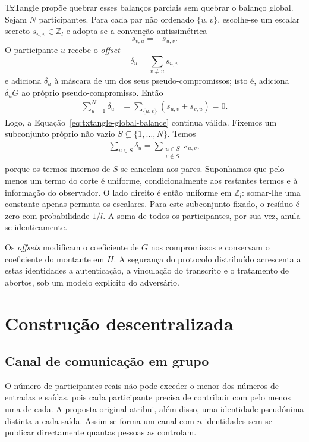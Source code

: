 TxTangle propõe quebrar esses balanços parciais sem quebrar o balanço global.
Sejam \(N\) participantes. Para cada par não ordenado \(\{u,v\}\), escolhe-se
um escalar secreto \(s_{u,v}\in\mathbb Z_l\) e adopta-se a convenção
antissimétrica
\[
 s_{v,u}=-s_{u,v}.
\]
O participante \(u\) recebe o \emph{offset}
\[
 \delta_u=\sum_{v\ne u}s_{u,v}
\]
e adiciona \(\delta_u\) à máscara de um dos seus pseudo-compromissos; isto é,
adiciona \(\delta_uG\) ao próprio pseudo-compromisso. Então
\begin{align}
 \sum_{u=1}^{N}\delta_u
 &=\sum_{\{u,v\}}(s_{u,v}+s_{v,u})=0.           \label{eq:txtangle-offset-zero}
\end{align}
Logo, a Equação~\eqref{eq:txtangle-global-balance} continua válida. Fixemos um
subconjunto próprio não vazio \(S\subsetneq\{1,\ldots,N\}\). Temos
\begin{align}
 \sum_{u\in S}\delta_u
   =\sum_{\substack{u\in S\\v\notin S}}s_{u,v}, \label{eq:txtangle-cut}
\end{align}
porque os termos internos de \(S\) se cancelam aos pares. Suponhamos que
pelo menos um termo do corte é uniforme, condicionalmente aos restantes
termos e à informação do observador. O lado direito é então uniforme em
\(\mathbb Z_l\): somar-lhe uma constante apenas permuta os escalares.
Para este subconjunto fixado, o resíduo é zero com probabilidade \(1/l\).
A soma de todos os participantes, por sua vez, anula-se identicamente.

Os \emph{offsets} modificam o coeficiente de \(G\) nos compromissos e
conservam o coeficiente do montante em \(H\). A segurança do protocolo
distribuído acrescenta a estas identidades a autenticação, a vinculação
do transcrito e o tratamento de abortos, sob um modelo explícito do adversário.



\section{Construção descentralizada}

\subsection{Canal de comunicação em grupo}
\label{subsec:n-way-channel}

O número de participantes reais não pode exceder o menor dos números de
entradas e saídas, pois cada participante precisa de contribuir com pelo menos
uma de cada. A proposta original atribui, além disso, uma identidade pseudónima
distinta a cada saída. Assim se forma um canal com \(n\) identidades sem se
publicar directamente quantas pessoas as controlam.

